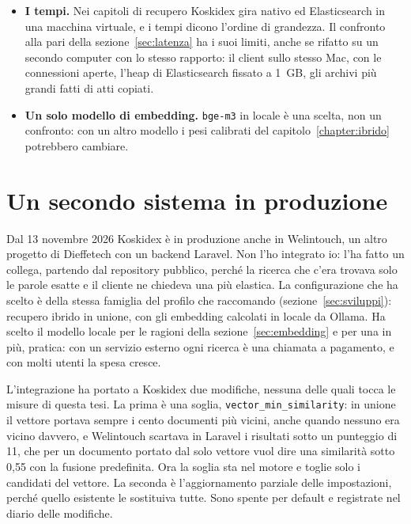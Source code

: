 \begin{itemize}
        in Elasticsearch, che chiede un \emph{char filter} per formato, e le
        clausole per parola sono una delle traduzioni possibili delle
        impostazioni di Koskidex.
  \item \textbf{I tempi.} Nei capitoli di recupero Koskidex gira nativo ed
        Elasticsearch in una macchina virtuale, e i tempi dicono l'ordine di
        grandezza. Il confronto alla pari della
        sezione~\ref{sec:latenza} ha i suoi limiti, anche se rifatto su un secondo
        computer con lo stesso rapporto: il client sullo stesso Mac,
        con le connessioni aperte, l'heap di Elasticsearch fissato a 1~GB, gli
        archivi più grandi fatti di atti copiati.
  \item \textbf{Un solo modello di embedding.} \texttt{bge-m3} in locale è una
        scelta, non un confronto: con un altro modello i pesi calibrati del
        capitolo~\ref{chapter:ibrido} potrebbero cambiare.
\end{itemize}

\section{Un secondo sistema in produzione}\label{sec:welintouch}

Dal 13 novembre 2026 Koskidex è in produzione anche in Welintouch, un altro
progetto di Dieffetech con un backend Laravel. Non l'ho integrato io: l'ha fatto
un collega, partendo dal repository pubblico, perché la ricerca che c'era trovava
solo le parole esatte e il cliente ne chiedeva una più elastica. La configurazione
che ha scelto è della stessa famiglia del profilo che raccomando
(sezione~\ref{sec:sviluppi}): recupero ibrido in unione, con gli embedding calcolati
in locale da Ollama. Ha scelto il modello locale per le ragioni della
sezione~\ref{sec:embedding} e per una in più, pratica: con un servizio esterno ogni
ricerca è una chiamata a pagamento, e con molti utenti la spesa cresce.

L'integrazione ha portato a Koskidex due modifiche, nessuna delle quali tocca le
misure di questa tesi. La prima è una soglia, \texttt{vector\_min\_similarity}: in
unione il vettore portava sempre i cento documenti più vicini, anche quando
nessuno era vicino davvero, e Welintouch scartava in Laravel i risultati sotto un
punteggio di 11, che per un documento portato dal solo vettore vuol dire una
similarità sotto 0,55 con la fusione predefinita. Ora la soglia sta nel motore e
toglie solo i candidati del vettore. La seconda è l'aggiornamento parziale delle
impostazioni, perché quello esistente le sostituiva tutte. Sono spente per
default e registrate nel diario delle modifiche.

